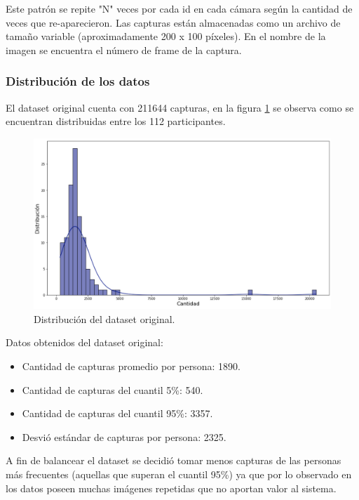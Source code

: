 Este patrón se repite "N" veces por cada id en cada cámara según la cantidad de veces que re-aparecieron. Las capturas están almacenadas como un archivo  de tamaño variable (aproximadamente 200 x 100 píxeles). En el nombre de la imagen se encuentra el número de frame de la captura.

\newpage

\subsubsection{Distribución de los datos}

El dataset original cuenta con 211644 capturas, en la figura \ref{fig:distribucionOriginal} se observa como se encuentran distribuidas entre los 112 participantes.

\begin{figure}[ht]
	\centering
	\includegraphics[scale=.50]{./Figures/distribucionOriginal.png}
	\caption{Distribución del dataset original.}
	\label{fig:distribucionOriginal}
\end{figure}

Datos obtenidos del dataset original:
\begin{itemize}
\item Cantidad de capturas promedio por persona: 1890.
\item Cantidad de capturas del cuantil 5\%: 540.
\item Cantidad de capturas del cuantil 95\%: 3357.
\item Desvió estándar de capturas por persona: 2325.
\end{itemize}

A fin de balancear el dataset se decidió tomar menos capturas de las personas más frecuentes (aquellas que superan el cuantil 95\%) ya que por lo observado en los datos poseen muchas imágenes repetidas que no aportan valor al sistema.

